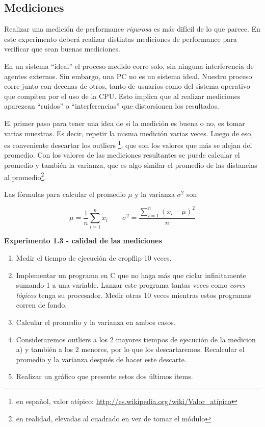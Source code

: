 \subsection{Mediciones}

Realizar una medición de performance \emph{rigurosa} es más difícil de lo 
que parece. 
En este experimento deberá realizar distintas mediciones de performance 
para verificar que sean buenas mediciones.

En un sistema ``ideal'' el proceso medido corre solo, sin ninguna 
interferencia de agentes externos. 
Sin embargo, una PC no es un sistema ideal. 
Nuestro proceso corre junto con decenas de otros, tanto de usuarios como 
del sistema operativo que compiten por el uso de la CPU. 
Esto implica que al realizar mediciones aparezcan ``ruidos'' o 
``interferencias'' que distorsionen los resultados.

El primer paso para tener una idea de si la medición es buena o no, 
es tomar varias muestras. 
Es decir, repetir la misma medición varias veces.
Luego de eso, es conveniente descartar los outliers
\footnote{en español, valor atípico: \url{http://es.wikipedia.org/wiki/Valor_atípico}}, 
que son los valores que más se alejan del promedio. 
Con los valores de las mediciones resultantes se puede calcular el promedio 
y también la varianza, que es algo similar el promedio de las distancias al 
promedio\footnote{en realidad, elevadas al cuadrado en vez de tomar el módulo}.

Las fórmulas para calcular el promedio $\mu$ y la varianza $\sigma^2$ son

$$
\mu = \frac{1}{n}\sum_{i=1}^{n} x_i \qquad \sigma^2 = \frac{\displaystyle\sum_{i=1}^{n}(x_i - \mu)^2} {n}
$$

\newpage
\vspace*{0.3cm} \noindent
\textbf{Experimento 1.3 - calidad de las mediciones}

\begin{enumerate}
    \item Medir el tiempo de ejecución de cropflip 10 veces. 
    \item Implementar un programa en C que no haga más que ciclar 
            infinitamente sumando 1 a una variable. 
            Lanzar este programa tantas veces como \emph{cores lógicos} tenga 
            su procesador. 
            Medir otras 10 veces mientras estos programas corren de fondo.
    \item Calcular el promedio y la varianza en ambos casos.
    \item Consideraremos outliers a los 2 mayores tiempos
     de ejecución de la medicion a) y también a los 2 menores,
     por lo que los descartaremos. Recalcular el promedio y la varianza después de hacer este descarte.
    \item Realizar un gráfico que presente estos dos últimos items.
\end{enumerate}

